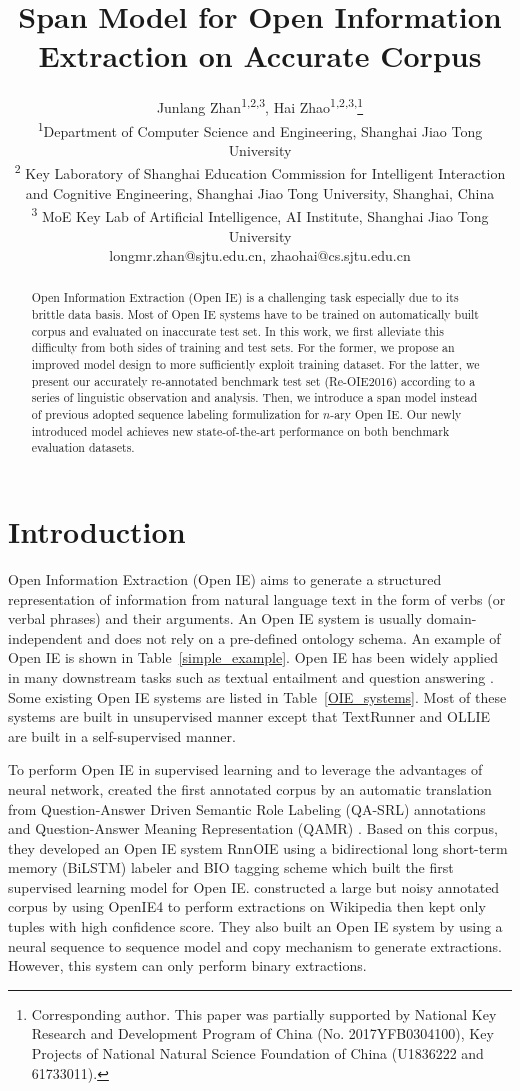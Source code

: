 \documentclass[letterpaper]{article} %
\title{Span Model for Open Information Extraction on Accurate Corpus}
\author{Junlang Zhan\textsuperscript{\rm 1,\rm 2,\rm 3}, Hai Zhao\textsuperscript{\rm 1,\rm 2,\rm 3,}\thanks{Corresponding author. This paper was partially supported by National Key Research and Development Program of China (No. 2017YFB0304100), 
Key Projects of National Natural Science Foundation of China (U1836222 and 61733011).}\\ %
\textsuperscript{\rm 1}Department of Computer Science and Engineering, Shanghai Jiao Tong University\\ %
\textsuperscript{\rm 2} Key Laboratory of Shanghai Education Commission for Intelligent Interaction \\
and Cognitive Engineering, Shanghai Jiao Tong University, Shanghai, China \\
\textsuperscript{\rm 3} MoE Key Lab of Artificial Intelligence, AI Institute, Shanghai Jiao Tong University \\
longmr.zhan@sjtu.edu.cn, zhaohai@cs.sjtu.edu.cn %
}
\begin{document}
\maketitle

\begin{abstract}
Open Information Extraction (Open IE) is a challenging task especially due to its brittle data basis. Most of Open IE systems have to be trained on automatically built corpus and evaluated on inaccurate test set. In this work, we first alleviate this difficulty from both sides of training and test sets. For the former, we propose an improved model design to more sufficiently exploit training dataset. For the latter, we present our accurately re-annotated benchmark test set (Re-OIE2016) according to a series of linguistic observation and analysis. Then, we introduce a span model instead of previous adopted sequence labeling formulization for $n$-ary Open IE. Our newly introduced model achieves new state-of-the-art performance on both benchmark evaluation datasets.
\end{abstract}

\section{Introduction}
Open Information Extraction (Open IE) aims to generate a structured representation of information from natural language text in the form of verbs (or verbal phrases) and their arguments. An Open IE system is usually domain-independent and does not rely on a pre-defined ontology schema. An example of Open IE is shown in Table~\ref{simple_example}. Open IE has been widely applied in many downstream tasks such as textual entailment and question answering \cite{Fader2014OpenQA}. Some existing Open IE systems are listed in Table~\ref{OIE_systems}. Most of these systems are built in unsupervised manner except that TextRunner and OLLIE are built in a self-supervised manner.

To perform Open IE in supervised learning and to leverage the advantages of neural network, \cite{Stanovsky2018SupervisedOI} created the first annotated corpus by an automatic translation from Question-Answer Driven Semantic Role Labeling (QA-SRL) annotations \cite{He2015QuestionAnswerDS} and Question-Answer Meaning Representation (QAMR) \cite{Michael2018CrowdsourcingQM}. Based on this corpus, they developed an Open IE system RnnOIE using a bidirectional long short-term memory (BiLSTM) labeler and BIO tagging scheme which built the first supervised learning model for Open IE. \cite{Cui2018NeuralOI} constructed a large but noisy annotated corpus by using OpenIE4 to perform extractions on Wikipedia then kept only tuples with high confidence score. They also built an Open IE system by using a neural sequence to sequence model and copy mechanism to generate extractions. However, this system can only perform binary extractions.
\end{document}
